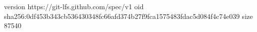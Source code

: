 version https://git-lfs.github.com/spec/v1
oid sha256:0df453b343cb536430348fc66afd374b27f9fca1575483fdac5d084f4c74e039
size 87540
